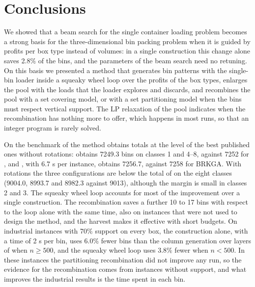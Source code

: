 \section{Conclusions}
\label{sec:conclusions}

We showed that a beam search for the single container loading problem becomes a strong basis for the
three-dimensional bin packing problem when it is guided by profits per box type instead of volumes: in a single
construction this change alone saves 2.8\% of the bins, and the parameters of the beam search need no retuning.
On this basis we presented a method that generates bin patterns with the
single-bin loader inside a squeaky wheel loop over the profits of the box types, enlarges the pool with
the loads that the loader explores and discards, and recombines the pool with a set covering model, or
with a set partitioning model when the bins must respect vertical support. The LP relaxation of the
pool indicates when the recombination has nothing more to offer, which happens in most runs, so that an
integer program is rarely solved.

On the benchmark of \citet{Martello2000} the method obtains totals at the level of the best published
ones without rotations: \cfgqual{} obtains 7249.3 bins on classes 1 and 4--8, against 7252 for
\citet{Mahvash2018}, and \cfgfast{}, with 6.7 s per instance, obtains 7256.7, against 7258 for BRKGA. With rotations
the three configurations are below the total of \citet{Mahvash2018} on the eight classes (9004.0, 8993.7 and
8982.3 against 9013), although the margin is small in classes 2 and 3. The squeaky wheel loop accounts for most of
the improvement over a single construction. The recombination saves a further 10 to 17 bins with respect to the loop alone
with the same time, also on instances that were not used to design the method, and the harvest makes it effective
with short budgets. On industrial instances with 70\% support on every box, the construction alone, with a time of 2 s per bin,
uses 6.0\% fewer bins than the column generation over layers of \citet{Elhedhli2019} when $n\ge 500$, and the squeaky wheel loop
uses 3.8\% fewer when $n<500$. In these instances the partitioning recombination did not improve any run, so the evidence for
the recombination comes from instances without support, and what improves the industrial results is the time spent in each bin.

